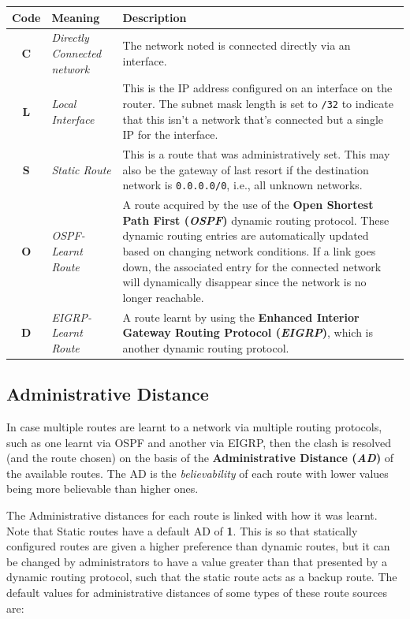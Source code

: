 \vspace{-10pt}
\noindent
\begin{center}
	\begin{tabular}{clm{}}
		\toprule
		\textbf{Code} &\textbf{Meaning} &\textbf{Description} \\
		\midrule
		\textbf{C} &\textit{Directly Connected network} &The network noted is connected directly via an interface.\\
		\textbf{L} &\textit{Local Interface} &This is the IP address configured on an interface on the router. The subnet mask length is set to \verb|/32| to indicate that this isn't a network that's connected but a single IP for the interface.\\
		\textbf{S} &\textit{Static Route} &This is a route that was administratively set. This may also be the gateway of last resort if the destination network is \verb|0.0.0.0/0|, i.e., all unknown networks.\\
		\textbf{O} &\textit{OSPF-Learnt Route} &A route acquired by the use of the \textbf{Open Shortest Path First (\textit{OSPF})} dynamic routing protocol. These dynamic routing entries are automatically updated based on changing network conditions. If a link goes down, the associated entry for the connected network will dynamically disappear since the network is no longer reachable. \\
		\textbf{D} &\textit{EIGRP-Learnt Route} &A route learnt by using the \textbf{Enhanced Interior Gateway Routing Protocol (\textit{EIGRP})}, which is another dynamic routing protocol.\\
		\bottomrule
	\end{tabular}
\end{center}

\subsection{Administrative Distance}
In case multiple routes are learnt to a network via multiple routing protocols, such as one learnt via OSPF and another via EIGRP, then the clash is resolved (and the route chosen) on the basis of the \textbf{Administrative Distance (\textit{AD})} of the available routes. The AD is the \textit{believability} of each route with lower values being more believable than higher ones. 

The Administrative distances for each route is linked with how it was learnt. Note that Static routes have a default AD of \textbf{1}. This is so that statically configured routes are given a higher preference than dynamic routes, but it can be changed by administrators to have a value greater than that presented by a dynamic routing protocol, such that the static route acts as a backup route. The default values for administrative distances of some types of these route sources are: 

